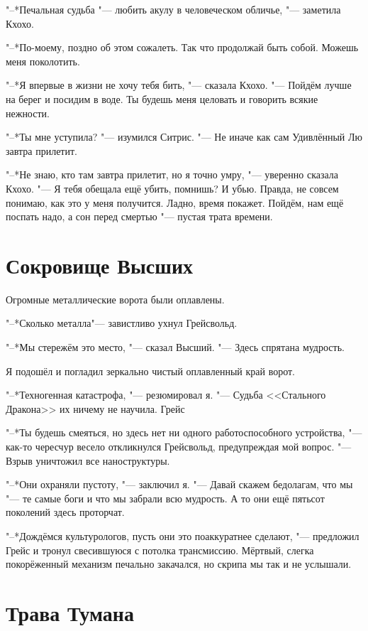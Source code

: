 "--*Печальная судьба "--- любить акулу в человеческом обличье, "--- заметила Кхохо.

"--*По-моему, поздно об этом сожалеть.
Так что продолжай быть собой.
Можешь меня поколотить.

"--*Я впервые в жизни не хочу тебя бить, "--- сказала Кхохо.
"--- Пойдём лучше на берег и посидим в воде.
Ты будешь меня целовать и говорить всякие нежности.

"--*Ты мне уступила? "--- изумился Ситрис.
"--- Не иначе как сам Удивлённый Лю завтра прилетит.

"--*Не знаю, кто там завтра прилетит, но я точно умру, "--- уверенно сказала Кхохо.
"--- Я тебя обещала ещё убить, помнишь?
И убью.
Правда, не совсем понимаю, как это у меня получится.
Ладно, время покажет.
Пойдём, нам ещё поспать надо, а сон перед смертью "--- пустая трата времени.

\section{Сокровище Высших}

Огромные металлические ворота были оплавлены.

"--*Сколько металла\ldotst "--- завистливо ухнул Грейсвольд.

"--*Мы стережём это место, "--- сказал Высший.
"--- Здесь спрятана мудрость.

Я подошёл и погладил зеркально чистый оплавленный край ворот.

"--*Техногенная катастрофа, "--- резюмировал я.
"--- Судьба <<Стального Дракона>> их ничему не научила.
Грейс\ldotst

"--*Ты будешь смеяться, но здесь нет ни одного работоспособного устройства, "--- как-то чересчур весело откликнулся Грейсвольд, предупреждая мой вопрос.
"--- Взрыв уничтожил все наноструктуры.

"--*Они охраняли пустоту, "--- заключил я.
"--- Давай скажем бедолагам, что мы "--- те самые боги и что мы забрали всю мудрость.
А то они ещё пятьсот поколений здесь проторчат.

"--*Дождёмся культурологов, пусть они это поаккуратнее сделают, "--- предложил Грейс и тронул свесившуюся с потолка трансмиссию.
Мёртвый, слегка покорёженный механизм печально закачался, но скрипа мы так и не услышали.

\section{Трава Тумана}

